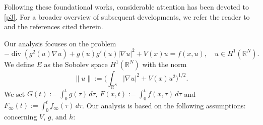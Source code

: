 \documentclass[reqno]{amsart}
\begin{document}
Following these foundational works, considerable attention has been devoted to \eqref{p3}. 
For a broader overview of subsequent developments, we refer the reader to 
\cite{fang3, fang2, Jeanjean, Lehrer,  Xue} and the references cited therein. 

Our analysis focuses on the problem
\begin{equation}
\label{q1}
-\operatorname{div} (g^2(u)\nabla u)+g(u)g'(u)|\nabla u|^2+V(x)u=f(x,u), \quad u\in H^1(\mathbb{R}^{N}).
\end{equation}
We define   $E$ as the Sobolev space $H^{1}(\mathbb{R}^{N})$  with the norm 
$$
\|u\|:=\Big(\int_{\mathbb{R}^N}|\nabla u|^2+V(x)u^2\Big)^{1/2}.
$$ 
We set $G(t):=\int^t_0g(\tau)\,d\tau$,  $F(x,t):=\int^t_0f(x,\tau)\,d\tau$ and 
$F_{\infty}(t):=\int^t_0f_{\infty}(\tau)\,d\tau$. Our analysis is based on the following assumptions: concerning $V$, $g$, and $h$:
\end{document}

